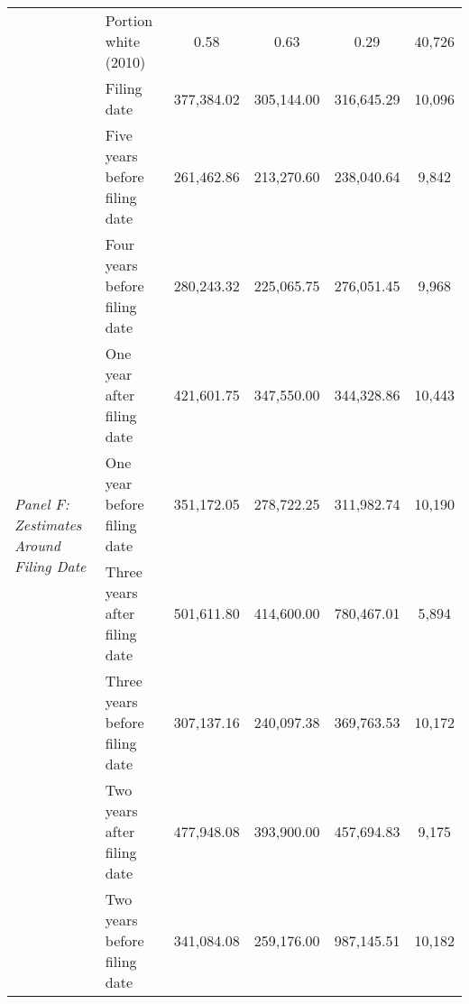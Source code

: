 \begin{tabular}{llcccc}
 & Portion white (2010) & 0.58 & 0.63 & 0.29 & 40,726 \\
\cline{1-6}
\multirow[c]{9}{4cm}{\textit{Panel F: Zestimates Around Filing Date}} & Filing date & 377,384.02 & 305,144.00 & 316,645.29 & 10,096 \\
 & Five years before filing date & 261,462.86 & 213,270.60 & 238,040.64 & 9,842 \\
 & Four years before filing date & 280,243.32 & 225,065.75 & 276,051.45 & 9,968 \\
 & One year after filing date & 421,601.75 & 347,550.00 & 344,328.86 & 10,443 \\
 & One year before filing date & 351,172.05 & 278,722.25 & 311,982.74 & 10,190 \\
 & Three years after filing date & 501,611.80 & 414,600.00 & 780,467.01 & 5,894 \\
 & Three years before filing date & 307,137.16 & 240,097.38 & 369,763.53 & 10,172 \\
 & Two years after filing date & 477,948.08 & 393,900.00 & 457,694.83 & 9,175 \\
 & Two years before filing date & 341,084.08 & 259,176.00 & 987,145.51 & 10,182 \\
\cline{1-6}
\bottomrule
\end{tabular}
